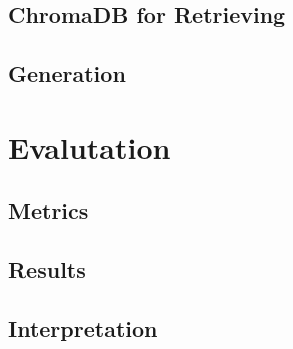     \subsection{ChromaDB for Retrieving}
    \subsection{Generation}

\section{Evalutation}
    \subsection{Metrics}
    \subsection{Results}
    \subsection{Interpretation}

    
    
    
    


    